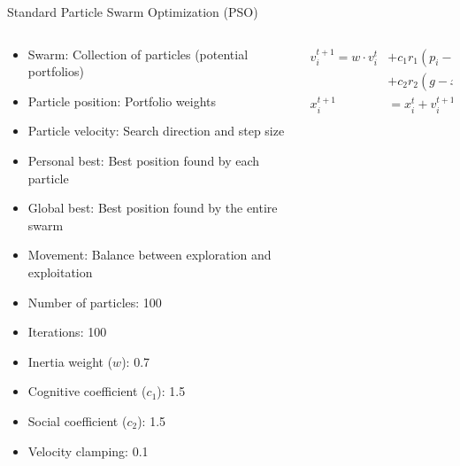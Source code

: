 \documentclass[aspectratio=169,xcolor=table]{beamer}
\begin{document}
\begin{frame}{Standard Particle Swarm Optimization (PSO)}
  \begin{columns}
    \begin{column}{0.55\textwidth}
      \begin{tcolorbox}[
        enhanced,
        colback=blue!5,
        colframe=blue!70,
        arc=2mm,
        title=PSO Components,
        fonttitle=\bfseries\large,
        boxrule=0.5mm
      ]
        \begin{itemize}
          \item Swarm: Collection of particles (potential portfolios)
          \item Particle position: Portfolio weights
          \item Particle velocity: Search direction and step size
          \item Personal best: Best position found by each particle
          \item Global best: Best position found by the entire swarm
          \item Movement: Balance between exploration and exploitation
        \end{itemize}
      \end{tcolorbox}
      
      \vspace{0.3cm}
      
      \begin{tcolorbox}[
        enhanced,
        colback=green!5,
        colframe=green!70,
        arc=2mm,
        title=Implementation Parameters,
        fonttitle=\bfseries\large,
        boxrule=0.5mm
      ]
        \begin{itemize}
          \item Number of particles: 100
          \item Iterations: 100
          \item Inertia weight ($w$): 0.7
          \item Cognitive coefficient ($c_1$): 1.5
          \item Social coefficient ($c_2$): 1.5
          \item Velocity clamping: 0.1
        \end{itemize}
      \end{tcolorbox}
    \end{column}
    
    \begin{column}{0.45\textwidth}
      \begin{align}
        v_i^{t+1} = w \cdot v_i^t &+ c_1 r_1 (p_i - x_i^t) \\
        &+ c_2 r_2 (g - x_i^t) \nonumber \\
        x_i^{t+1} &= x_i^t + v_i^{t+1}
      \end{align}
      

\end{column}
\end{columns}
\end{frame}
\end{document}
